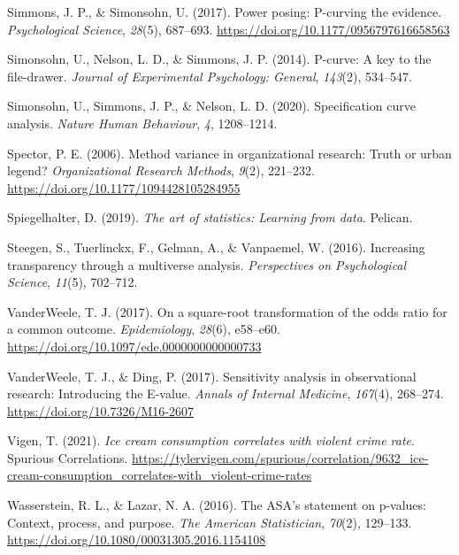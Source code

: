 \documentclass[
]{book}
\newlength{\cslhangindent}
\newenvironment{CSLReferences}[2] %
 {\begin{list}{}{%
  \setlength{\itemindent}{0pt}
  \setlength{\leftmargin}{0pt}
  \setlength{\parsep}{0pt}
  \ifodd #1
   \setlength{\leftmargin}{\cslhangindent}
   \setlength{\itemindent}{-1\cslhangindent}
  \fi
  \setlength{\itemsep}{#2\baselineskip}}}
 {\end{list}}
\begin{document}
\begin{CSLReferences}{1}{0}
Simmons, J. P., \& Simonsohn, U. (2017). Power posing: {P}-curving the evidence. \emph{Psychological Science}, \emph{28}(5), 687--693. \url{https://doi.org/10.1177/0956797616658563}

Simonsohn, U., Nelson, L. D., \& Simmons, J. P. (2014). P-curve: A key to the file-drawer. \emph{Journal of Experimental Psychology: General}, \emph{143}(2), 534--547.

Simonsohn, U., Simmons, J. P., \& Nelson, L. D. (2020). Specification curve analysis. \emph{Nature Human Behaviour}, \emph{4}, 1208--1214.

Spector, P. E. (2006). Method variance in organizational research: Truth or urban legend? \emph{Organizational Research Methods}, \emph{9}(2), 221--232. \url{https://doi.org/10.1177/1094428105284955}

Spiegelhalter, D. (2019). \emph{The art of statistics: Learning from data}. Pelican.

Steegen, S., Tuerlinckx, F., Gelman, A., \& Vanpaemel, W. (2016). Increasing transparency through a multiverse analysis. \emph{Perspectives on Psychological Science}, \emph{11}(5), 702--712.

VanderWeele, T. J. (2017). On a square-root transformation of the odds ratio for a common outcome. \emph{Epidemiology}, \emph{28}(6), e58--e60. \url{https://doi.org/10.1097/ede.0000000000000733}

VanderWeele, T. J., \& Ding, P. (2017). Sensitivity analysis in observational research: Introducing the {E}-value. \emph{Annals of Internal Medicine}, \emph{167}(4), 268--274. \url{https://doi.org/10.7326/M16-2607}

Vigen, T. (2021). \emph{Ice cream consumption correlates with violent crime rate}. Spurious Correlations. \url{https://tylervigen.com/spurious/correlation/9632_ice-cream-consumption_correlates-with_violent-crime-rates}

Wasserstein, R. L., \& Lazar, N. A. (2016). The {ASA}'s statement on p-values: Context, process, and purpose. \emph{The American Statistician}, \emph{70}(2), 129--133. \url{https://doi.org/10.1080/00031305.2016.1154108}


\end{CSLReferences}
\end{document}
